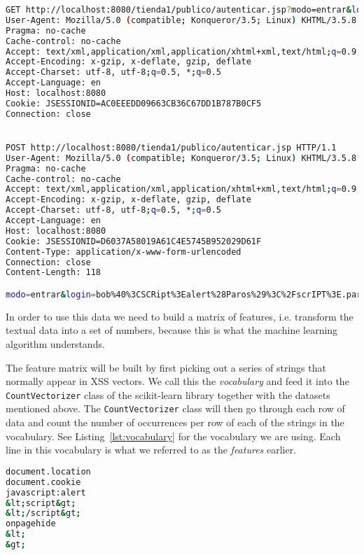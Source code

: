 \documentclass[10pt,journal,compsoc]{IEEEtran}
\begin{document}
\begin{lstlisting}[language=bash, caption={Example of data from the CSIC 2010 dataset}, label={lst:csic2010}]
GET http://localhost:8080/tienda1/publico/autenticar.jsp?modo=entrar&login=bob%40%3CSCRipt%3Ealert%28Paros%29%3C%2FscrIPT%3E.parosproxy.org&pwd=84m3ri156&remember=on&B1=Entrar HTTP/1.1
User-Agent: Mozilla/5.0 (compatible; Konqueror/3.5; Linux) KHTML/3.5.8 (like Gecko)
Pragma: no-cache
Cache-control: no-cache
Accept: text/xml,application/xml,application/xhtml+xml,text/html;q=0.9,text/plain;q=0.8,image/png,*/*;q=0.5
Accept-Encoding: x-gzip, x-deflate, gzip, deflate
Accept-Charset: utf-8, utf-8;q=0.5, *;q=0.5
Accept-Language: en
Host: localhost:8080
Cookie: JSESSIONID=AC0EEEDD09663CB36C67DD1B787B0CF5
Connection: close


POST http://localhost:8080/tienda1/publico/autenticar.jsp HTTP/1.1
User-Agent: Mozilla/5.0 (compatible; Konqueror/3.5; Linux) KHTML/3.5.8 (like Gecko)
Pragma: no-cache
Cache-control: no-cache
Accept: text/xml,application/xml,application/xhtml+xml,text/html;q=0.9,text/plain;q=0.8,image/png,*/*;q=0.5
Accept-Encoding: x-gzip, x-deflate, gzip, deflate
Accept-Charset: utf-8, utf-8;q=0.5, *;q=0.5
Accept-Language: en
Host: localhost:8080
Cookie: JSESSIONID=D6037A58019A61C4E5745B952029D61F
Content-Type: application/x-www-form-urlencoded
Connection: close
Content-Length: 118

modo=entrar&login=bob%40%3CSCRipt%3Ealert%28Paros%29%3C%2FscrIPT%3E.parosproxy.org&pwd=84m3ri156&remember=on&B1=Entrar

\end{lstlisting}


In order to use this data we need to build a matrix of features, i.e. transform the textual data into a set of numbers,
because this is what the machine learning algorithm understands.

The feature matrix will be built by first picking out a series of strings that normally appear in XSS vectors.
We call this the \emph{vocabulary} and feed it into the \verb|CountVectorizer| class of the scikit-learn
\citep*{scikit-learn} \citep*{sklearn_api} library together with the datasets mentioned above.
The \verb|CountVectorizer| class will then go through each row of data and count the number of occurrences per row
of each of the strings in the vocabulary. See Listing~\ref{lst:vocabulary} for the vocabulary we are using.
Each line in this vocabulary is what we referred to as the \emph{features} earlier.

\begin{lstlisting}[language=bash, caption={The vocabulary we use as basis for our classifier.},
                    label={lst:vocabulary}]
document.location
document.cookie
javascript:alert
&lt;script&gt;
&lt;/script&gt;
onpagehide
&lt;
&gt;

\end{lstlisting}
\end{document}
